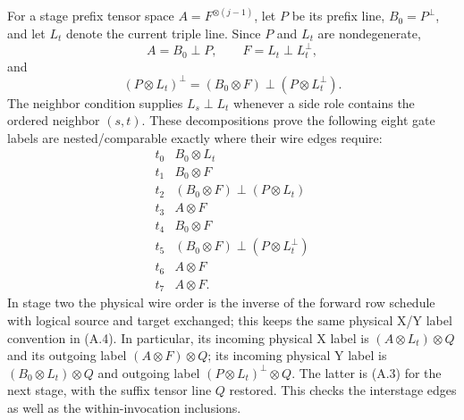 For a stage prefix tensor space $A=F^{\otimes(j-1)}$, let $P$ be its
prefix line, $B_0=P^\perp$, and let $L_t$ denote the current triple line.
Since $P$ and $L_t$ are nondegenerate,
\[
 A=B_0\perp P,\qquad F=L_t\perp L_t^\perp,
\]
and
\[
 (P\otimes L_t)^\perp
   =(B_0\otimes F)\perp(P\otimes L_t^\perp).        \tag{A.3}
\]
The neighbor condition supplies $L_s\perp L_t$ whenever a side role
contains the ordered neighbor $(s,t)$. These decompositions prove the
following eight gate labels are nested/comparable exactly where their
wire edges require:
\[
\begin{array}{c|l}
 t_0& B_0\otimes L_t\\
 t_1& B_0\otimes F\\
 t_2& (B_0\otimes F)\perp(P\otimes L_t)\\
 t_3& A\otimes F\\
 t_4& B_0\otimes F\\
 t_5& (B_0\otimes F)\perp(P\otimes L_t^\perp)\\
 t_6& A\otimes F\\
 t_7& A\otimes F.
\end{array}                                                   \tag{A.4}
\]
In stage two the physical wire order is the inverse of the forward row
schedule with logical source and target exchanged; this keeps the same
physical X/Y label convention in (A.4). In particular, its incoming
physical X label is $(A\otimes L_t)\otimes Q$ and its outgoing label
$(A\otimes F)\otimes Q$; its incoming physical Y label is
$(B_0\otimes L_t)\otimes Q$ and outgoing label
$(P\otimes L_t)^\perp\otimes Q$. The latter is (A.3) for the next
stage, with the suffix tensor line $Q$ restored. This checks the
interstage edges as well as the within-invocation inclusions.

